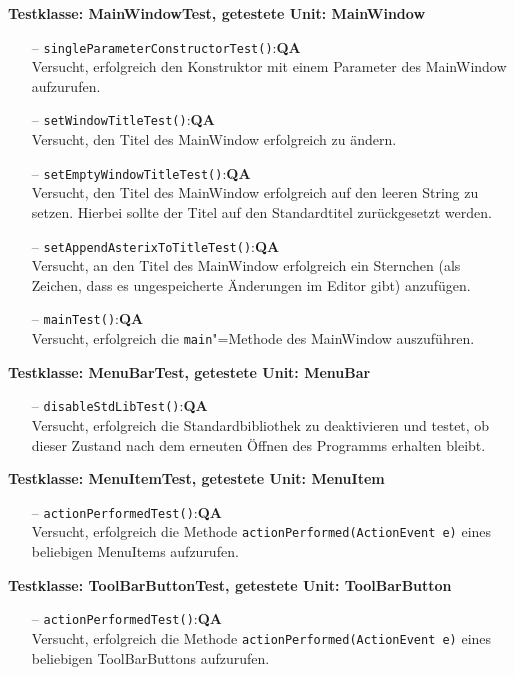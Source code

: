 \documentclass[parskip=full,11pt,twoside]{scrartcl}
\def\qa{\hfill\textbf{QA}}
\begin{document}
\textbf{Testklasse: MainWindowTest, getestete Unit: MainWindow}
\begin{itemize}
	\item[--] \texttt{singleParameterConstructorTest()}:\qa\\
	Versucht, erfolgreich den Konstruktor mit einem Parameter des MainWindow aufzurufen.
	\item[--] \texttt{setWindowTitleTest()}:\qa\\
	Versucht, den Titel des MainWindow erfolgreich zu ändern.
	\item[--] \texttt{setEmptyWindowTitleTest()}:\qa\\
	Versucht, den Titel des MainWindow erfolgreich auf den leeren String zu setzen. Hierbei sollte der Titel auf den Standardtitel zurückgesetzt werden.
	\item[--] \texttt{setAppendAsterixToTitleTest()}:\qa\\
	Versucht, an den Titel des MainWindow erfolgreich ein Sternchen (als Zeichen, dass es ungespeicherte Änderungen im Editor gibt) anzufügen.
	\item[--] \texttt{mainTest()}:\qa\\
	Versucht, erfolgreich die \texttt{main}"=Methode des MainWindow auszuführen.
\end{itemize}

\textbf{Testklasse: MenuBarTest, getestete Unit: MenuBar}
\begin{itemize}
	\item[--] \texttt{disableStdLibTest()}:\qa\\
	Versucht, erfolgreich die Standardbibliothek zu deaktivieren und testet, ob dieser Zustand nach dem erneuten Öffnen des Programms erhalten bleibt.
\end{itemize}

\textbf{Testklasse: MenuItemTest, getestete Unit: MenuItem}
\begin{itemize}
	\item[--] \texttt{actionPerformedTest()}:\qa\\
	Versucht, erfolgreich die Methode \texttt{actionPerformed(ActionEvent e)} eines beliebigen MenuItems aufzurufen.
\end{itemize}

\textbf{Testklasse: ToolBarButtonTest, getestete Unit: ToolBarButton}
\begin{itemize}
	\item[--] \texttt{actionPerformedTest()}:\qa\\
	Versucht, erfolgreich die Methode \texttt{actionPerformed(ActionEvent e)} eines beliebigen ToolBarButtons aufzurufen.
\end{itemize}
\end{document}
